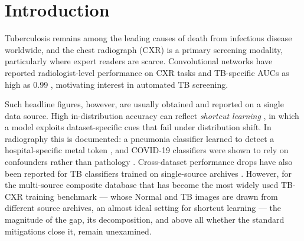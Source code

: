 \documentclass{article}
\begin{document}
\section{Introduction}

Tuberculosis remains among the leading causes of death from infectious disease worldwide, and the
chest radiograph (CXR) is a primary screening modality, particularly where expert readers are
scarce. Convolutional networks have reported radiologist-level performance on CXR tasks
\citep{rajpurkar2017chexnet} and TB-specific AUCs as high as 0.99 \citep{lakhani2017deep},
motivating interest in automated TB screening.

Such headline figures, however, are usually obtained and reported on a single data source.
High in-distribution accuracy can reflect \emph{shortcut learning} \citep{geirhos2020shortcut}, in
which a model exploits dataset-specific cues that fail under distribution shift. In radiography
this is documented: a pneumonia classifier learned to detect a hospital-specific metal token
\citep{zech2018variable}, and COVID-19 classifiers were shown to rely on confounders rather than
pathology \citep{degrave2021ai}. Cross-dataset performance drops have also been reported for TB
classifiers trained on single-source archives
\citep{sathitratanacheewin2020deep, karki2022generalization, shuaibu2026geographic}. However, for
the multi-source composite database that has become the most widely used TB-CXR training benchmark
--- whose Normal and TB images are drawn from different source archives, an almost ideal setting
for shortcut learning --- the magnitude of the gap, its decomposition, and above all whether the
standard mitigations close it, remain unexamined.
\end{document}
